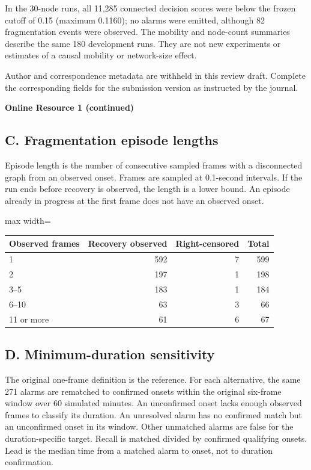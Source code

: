 \documentclass[10pt,a4paper]{article}
\begin{document}
\noindent In the 30-node runs, all 11,285 connected decision scores were below the frozen cutoff of 0.15 (maximum 0.1160); no alarms were emitted, although 82 fragmentation events were observed. The mobility and node-count summaries describe the same 180 development runs. They are not new experiments or estimates of a causal mobility or network-size effect.

\medskip
\noindent Author and correspondence metadata are withheld in this review draft. Complete the corresponding fields for the submission version as instructed by the journal.
\newpage
\begin{center}
{\large\bfseries Online Resource 1 (continued)}
\end{center}

\subsection*{C. Fragmentation episode lengths}
\noindent Episode length is the number of consecutive sampled frames with a disconnected graph from an observed onset. Frames are sampled at 0.1-second intervals. If the run ends before recovery is observed, the length is a lower bound. An episode already in progress at the first frame does not have an observed onset.

\begin{center}
\small
\begin{adjustbox}{max width=\linewidth}\begin{tabular}{lrrr}
\toprule
Observed frames & Recovery observed & Right-censored & Total \\
\midrule
1 & 592 & 7 & 599 \\
2 & 197 & 1 & 198 \\
3--5 & 183 & 1 & 184 \\
6--10 & 63 & 3 & 66 \\
11 or more & 61 & 6 & 67 \\
\bottomrule
\end{tabular}\end{adjustbox}
\end{center}

\subsection*{D. Minimum-duration sensitivity}
\noindent The original one-frame definition is the reference. For each alternative, the same 271 alarms are rematched to confirmed onsets within the original six-frame window over 60 simulated minutes. An unconfirmed onset lacks enough observed frames to classify its duration. An unresolved alarm has no confirmed match but an unconfirmed onset in its window. Other unmatched alarms are false for the duration-specific target. Recall is matched divided by confirmed qualifying onsets. Lead is the median time from a matched alarm to onset, not to duration confirmation.
\end{document}
